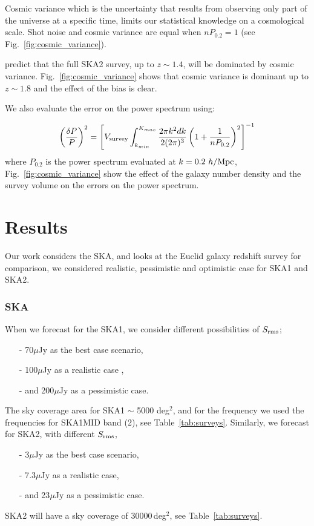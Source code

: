 \documentclass[useAMS,usenatbib]{mn2e}
\begin{document}
Cosmic variance which is the uncertainty that results from observing only part of the universe at a specific time,  limits our statistical knowledge on a cosmological scale. Shot noise and cosmic variance are equal when $n P_{0.2} = 1$ (see Fig.~\ref{fig:cosmic_variance}).

\cite{Abdalla:2009wr} predict that the  full SKA2 survey, up  to $z \sim 1.4$, will be dominated  by cosmic variance.  Fig.~\ref{fig:cosmic_variance} shows that  cosmic variance is dominant  up to $z\sim 1.8$ and the effect of the bias is clear.

We also evaluate  the error on the power spectrum using:

\begin{equation}
\left( \frac{\delta P}{P} \right)^2 =\left[ V_{\rm survey} \int_{k_{min}}^{K_{max}} \frac{ 2 \pi k^2 dk}{2 (2 \pi)^3} \left(1+\frac{1}{nP_{0.2}}\right)^2\right]^{-1}
\end{equation}
where $P_{0.2}$ is the power spectrum evaluated at $k = 0.2 \  h/{\rm Mpc}$, Fig.~\ref{fig:cosmic_variance} show the effect of the galaxy number density and the survey volume on the errors on the power spectrum.
\section{Results}
Our work considers the SKA, and looks at the  Euclid galaxy redshift  survey  for comparison, we considered realistic, pessimistic and optimistic case for SKA1 and SKA2. 
\subsubsection{SKA}\label{SKA}
When we forecast for the SKA1, we consider different possibilities of  $S_{\rm rms}$;
\begin{itemize}
\item[-] 70$\mu $Jy as the best case scenario,
\item[-] 100$\mu $Jy as a realistic case  , 
\item[-]  and 200$\mu$Jy  as a pessimistic case. 
\end{itemize}
The sky coverage area for SKA1 $\sim$ 5000 deg$^2$,  and for the frequency we used the frequencies for SKA1MID band (2), see Table~\ref{tab:surveys}.
Similarly, we forecast  for  SKA2,  with different $S_{\rm rms}$,
\begin{itemize}
\item[-]  3$\mu $Jy as the best case scenario, 
\item[-]  7.3$\mu $Jy as a realistic case,
\item[-]  and 23$\mu $Jy as a pessimistic case.
\end{itemize}
SKA2 will have a sky coverage of $30000\,$deg$^2$, see Table~\ref{tab:surveys}. 
\end{document}
